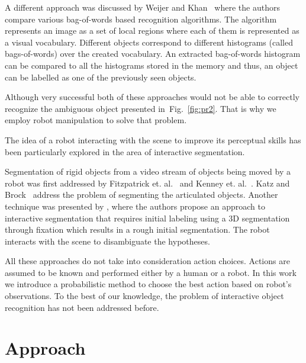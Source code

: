 \documentclass[conference]{IEEEtran}
\newcommand{\figref}[1]{Fig.~\ref{#1}}
\begin{document}
    A different approach was discussed by Weijer and Khan~\cite{van2013fusing} where the authors compare various bag-of-words based recognition algorithms. The algorithm represents an image as a set of local regions where each of them is represented as a visual vocabulary. Different objects correspond to different histograms (called bags-of-words) over the created vocabulary. An extracted bag-of-words histogram can be compared to all the histograms stored in the memory and thus, an object can be labelled as one of the previously seen objects.

    Although very successful both of these approaches would not be able to correctly recognize the ambiguous object presented in~\figref{fig:pr2}. That is why we employ robot manipulation to solve that problem.

    The idea of a robot interacting with the scene to improve its perceptual skills has been particularly explored in the area of interactive segmentation.

    Segmentation of rigid objects from a video stream of objects being moved by a robot was first addressed by Fitzpatrick et. al.~\cite{fitzpatrick_active_vision} and Kenney et. al.~\cite{KenneyInteractive}. Katz and Brock~\cite{Katz-WS-MM-ICRA2011} address the problem of segmenting the articulated objects. Another technique was presented by \cite{bergstrom11icvs}, where the authors propose an approach to interactive segmentation that requires initial labeling using  a 3D segmentation through fixation which results in a rough initial segmentation. The robot interacts with the scene to disambiguate the hypotheses.

    

    All these approaches do not take into consideration action choices. Actions are assumed to be known and performed either by a human or a robot. In this work we introduce a probabilistic method to choose the best action based on robot's observations. To the best of our knowledge, the problem of interactive object recognition has not been addressed before. 

\section{Approach}
	
\end{document}
